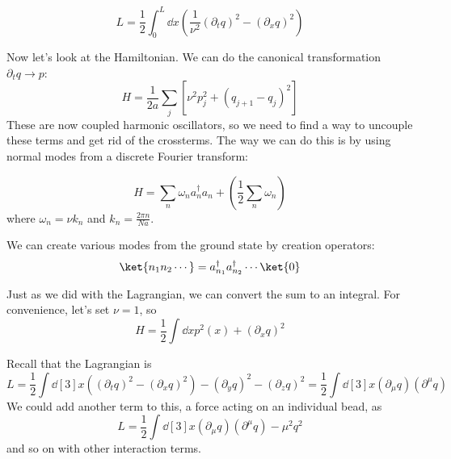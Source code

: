 \documentclass[a4paper,twoside,master.tex]{subfiles}
\begin{document}
\begin{equation}
    L = \frac{1}{2} \int_0^L \dd{x} \left( \frac{1}{\nu^2} (\partial_t q)^2 - (\partial_x q)^2 \right)
\end{equation}

Now let's look at the Hamiltonian. We can do the canonical transformation $ \partial_t q \to p $:
\begin{equation}
    H = \frac{1}{2a} \sum_j \left[ \nu^2 p_j^2 + (q_{j+1} - q_j)^2 \right]
\end{equation}
These are now coupled harmonic oscillators, so we need to find a way to uncouple these terms and get rid of the crossterms. The way we can do this is by using normal modes from a discrete Fourier transform:

\begin{equation}
    H = \sum_n \omega_n a_n^\dagger a_n + \left( \frac{1}{2} \sum_n \omega_n \right)
\end{equation}
where $ \omega_n = \nu k_n $ and $ k_n = \frac{2 \pi n}{Na} $.

We can create various modes from the ground state by creation operators:
\begin{equation}
    \ket{n_1 n_2 \cdots} = a^\dagger_{n_1} a^\dagger_{n_2} \cdots\ket{0}
\end{equation}

Just as we did with the Lagrangian, we can convert the sum to an integral. For convenience, let's set $ \nu = 1 $, so
\begin{equation}
    H = \frac{1}{2} \int \dd{x} p^2(x) + (\partial_x q)^2
\end{equation}

Recall that the Lagrangian is
\begin{equation}
    L = \frac{1}{2} \int \dd[3]{x} \left( (\partial_t q)^2 - (\partial_x q)^2 \right) - (\partial_y q)^2 - (\partial_z q)^2 = \frac{1}{2} \int \dd[3]{x} (\partial_{\mu} q)(\partial^{\mu} q)
\end{equation}
We could add another term to this, a force acting on an individual bead, as
\begin{equation}
    L = \frac{1}{2} \int \dd[3]{x} (\partial_{\mu} q)(\partial^{\mu} q) - \mu^2 q^2
\end{equation}
and so on with other interaction terms.
\end{document}
